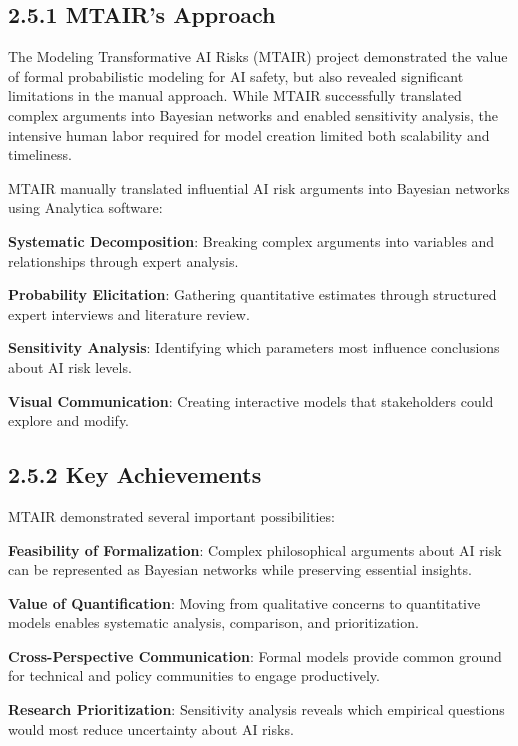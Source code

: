 \documentclass[
  11pt,
  letterpaper,
]{book}
\begin{document}
\subsection*{2.5.1 MTAIR's Approach}\label{sec-mtair-approach}

The Modeling Transformative AI Risks (MTAIR) project demonstrated the
value of formal probabilistic modeling for AI safety, but also revealed
significant limitations in the manual approach. While MTAIR successfully
translated complex arguments into Bayesian networks and enabled
sensitivity analysis, the intensive human labor required for model
creation limited both scalability and timeliness.

MTAIR manually translated influential AI risk arguments into Bayesian
networks using Analytica software:

\textbf{Systematic Decomposition}: Breaking complex arguments into
variables and relationships through expert analysis.

\textbf{Probability Elicitation}: Gathering quantitative estimates
through structured expert interviews and literature review.

\textbf{Sensitivity Analysis}: Identifying which parameters most
influence conclusions about AI risk levels.

\textbf{Visual Communication}: Creating interactive models that
stakeholders could explore and modify.

\subsection*{2.5.2 Key Achievements}\label{sec-mtair-achievements}

MTAIR demonstrated several important possibilities:

\textbf{Feasibility of Formalization}: Complex philosophical arguments
about AI risk can be represented as Bayesian networks while preserving
essential insights.

\textbf{Value of Quantification}: Moving from qualitative concerns to
quantitative models enables systematic analysis, comparison, and
prioritization.

\textbf{Cross-Perspective Communication}: Formal models provide common
ground for technical and policy communities to engage productively.

\textbf{Research Prioritization}: Sensitivity analysis reveals which
empirical questions would most reduce uncertainty about AI risks.
\end{document}
